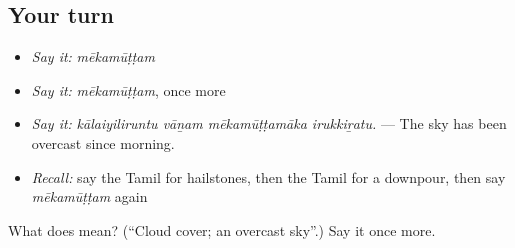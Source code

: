 \subsection*{Your turn}
\begin{itemize}
\raggedright
  \item \emph{Say it:} \emph{mēkamūṭṭam}
  \item \emph{Say it:} \emph{mēkamūṭṭam}, once more
  \item \emph{Say it:} \emph{kālaiyiliruntu vāṉam mēkamūṭṭamāka irukkiṟatu.} — The sky has been overcast since morning.
  \item \emph{Recall:} say the Tamil for hailstones, then the Tamil for a downpour, then say \emph{mēkamūṭṭam} again
\end{itemize}

\begin{tcolorbox}[breakable,colback=teal!4,colframe=teal!35!black,title={Before you move on}]
What does  mean? (\textquotedblleft{}Cloud cover; an overcast sky\textquotedblright{}.) Say it once more.
\end{tcolorbox}
